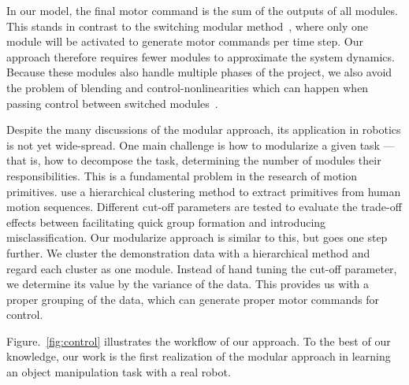 In our model, the final motor command is the sum of the outputs of all
modules. This stands in contrast to the switching modular
method~\citep{narendra1997adaptive}, where only one module will be
activated to generate motor commands per time step.  Our approach therefore
requires fewer modules to approximate the system dynamics.  %
Because these modules also handle multiple phases of the project, we
also avoid the problem of blending and control-nonlinearities which
can happen when passing control between switched modules~\citep{Brand00,Miura09}.


Despite the many discussions of the modular approach, its application
in robotics is not yet wide-spread. One main challenge is how to
modularize a given task --- that is, how to decompose the task,
determining the number of modules their responsibilities. This is a
fundamental problem in the research of motion
primitives. \citet{kulic2008incremental} use a hierarchical clustering
method to extract primitives from human motion sequences. Different
cut-off parameters are tested to evaluate the trade-off effects
between facilitating quick group formation and introducing
misclassification. Our modularize approach is similar to this, but
goes one step further. We cluster the demonstration data with a
hierarchical method and regard each cluster as one module. Instead of
hand tuning the cut-off parameter, we determine its value by the
variance of the data. This provides us with a proper grouping of the
data, which can generate proper motor commands for control.

Figure.~\ref{fig:control} illustrates the workflow of our approach. To
the best of our knowledge, our work is the first realization of the
modular approach in learning an object manipulation task with a real
robot.



